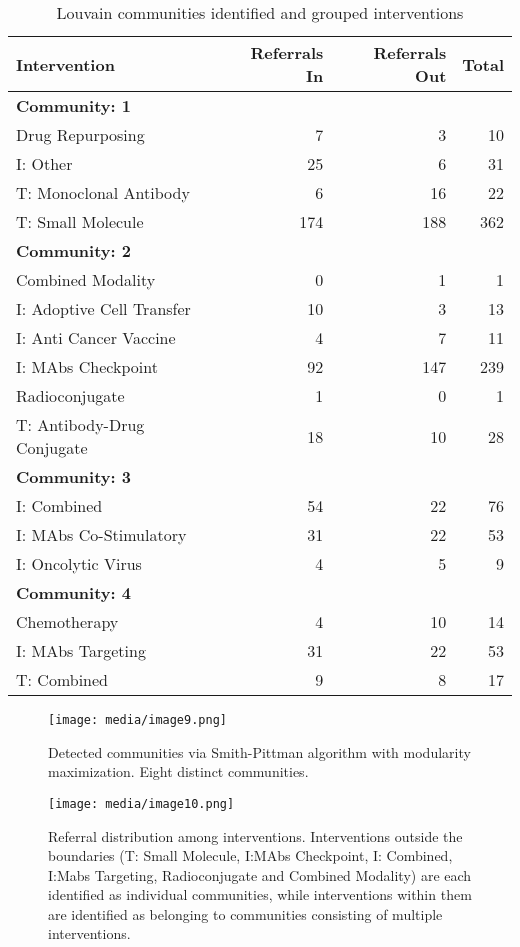 \documentclass{article}
\begin{document}
\begin{table}[htbp]
\centering
\begin{tabular}{lrrr}
\toprule
Intervention & Referrals In & Referrals Out & Total \\ 
\midrule
\multicolumn{4}{l}{\textbf{Community: 1}} \\ 
\midrule
Drug Repurposing & 7 & 3 & 10 \\ 
I: Other & 25 & 6 & 31 \\ 
T: Monoclonal Antibody & 6 & 16 & 22 \\ 
T: Small Molecule & 174 & 188 & 362 \\ 
\midrule
\multicolumn{4}{l}{\textbf{Community: 2}} \\ 
\midrule
Combined Modality & 0 & 1 & 1 \\ 
I: Adoptive Cell Transfer & 10 & 3 & 13 \\ 
I: Anti Cancer Vaccine & 4 & 7 & 11 \\ 
I: MAbs Checkpoint & 92 & 147 & 239 \\ 
Radioconjugate & 1 & 0 & 1 \\ 
T: Antibody-Drug Conjugate & 18 & 10 & 28 \\ 
\midrule
\multicolumn{4}{l}{\textbf{Community: 3}} \\ 
\midrule
I: Combined & 54 & 22 & 76 \\ 
I: MAbs Co-Stimulatory & 31 & 22 & 53 \\ 
I: Oncolytic Virus & 4 & 5 & 9 \\ 
\midrule
\multicolumn{4}{l}{\textbf{Community: 4}} \\ 
\midrule
Chemotherapy & 4 & 10 & 14 \\ 
I: MAbs Targeting & 31 & 22 & 53 \\ 
T: Combined & 9 & 8 & 17 \\ 
\bottomrule
\end{tabular}
\caption{Louvain communities identified and grouped interventions}
\end{table}

\begin{figure}
\centering
\texttt{[image: media/image9.png]}
\caption{Detected communities via Smith-Pittman
algorithm with modularity maximization. Eight distinct communities.}
\end{figure}

\begin{figure}
\centering
\texttt{[image: media/image10.png]}

\caption{Referral distribution among interventions.
Interventions outside the boundaries (T: Small Molecule, I:MAbs
Checkpoint, I: Combined, I:Mabs Targeting, Radioconjugate and Combined
Modality) are each identified as individual communities, while
interventions within them are identified as belonging to communities
consisting of multiple interventions.}
\end{figure}
\end{document}
